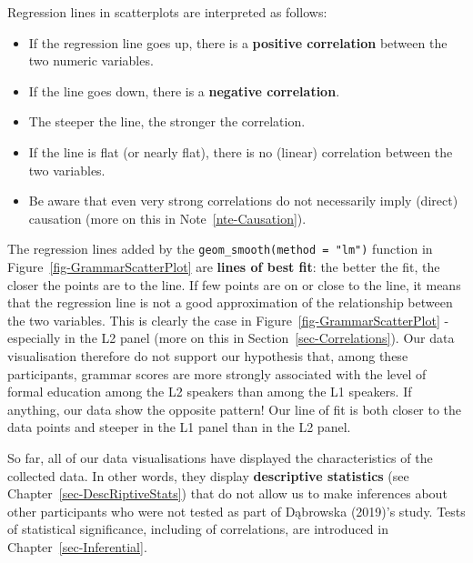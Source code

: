\documentclass[
  letterpaper,
  DIV=11,
  numbers=noendperiod]{scrreprt}
\providecommand{\tightlist}{%
  \setlength{\itemsep}{0pt}\setlength{\parskip}{0pt}}
\begin{document}
Regression lines in scatterplots are interpreted as follows:

\begin{itemize}
\tightlist
\item
  If the regression line goes up, there is a \textbf{positive
  correlation} between the two numeric variables.~
\item
  If the line goes down, there is a \textbf{negative correlation}.~
\item
  The steeper the line, the stronger the correlation.~
\item
  If the line is flat (or nearly flat), there is no (linear) correlation
  between the two variables.~
\item
  Be aware that even very strong correlations do not necessarily imply
  (direct) causation (more on this in Note~\ref{nte-Causation}).~
\end{itemize}

The regression lines added by the \texttt{geom\_smooth(method\ =\ "lm")}
function in Figure~\ref{fig-GrammarScatterPlot} are \textbf{lines of
best fit}: the better the fit, the closer the points are to the line. If
few points are on or close to the line, it means that the regression
line is not a good approximation of the relationship between the two
variables. This is clearly the case in
Figure~\ref{fig-GrammarScatterPlot} - especially in the L2 panel (more
on this in Section~\ref{sec-Correlations}). Our data visualisation
therefore do not support our hypothesis that, among these participants,
grammar scores are more strongly associated with the level of formal
education among the L2 speakers than among the L1 speakers. If anything,
our data show the opposite pattern! Our line of fit is both closer to
the data points and steeper in the L1 panel than in the L2 panel.

\begin{tcolorbox}[enhanced jigsaw, arc=.35mm, bottomrule=.15mm, bottomtitle=1mm, breakable, colback=white, colbacktitle=quarto-callout-warning-color!10!white, colframe=quarto-callout-warning-color-frame, coltitle=black, left=2mm, leftrule=.75mm, opacityback=0, opacitybacktitle=0.6, rightrule=.15mm, title=\textcolor{quarto-callout-warning-color}{\faExclamationTriangle}\hspace{0.5em}{Warning}, titlerule=0mm, toprule=.15mm, toptitle=1mm]

So far, all of our data visualisations have displayed the
characteristics of the collected data. In other words, they display
\textbf{descriptive statistics} (see Chapter~\ref{sec-DescRiptiveStats})
that do not allow us to make inferences about other participants who
were not tested as part of Dąbrowska (2019)'s study. Tests of
statistical significance, including of correlations, are introduced in
Chapter~\ref{sec-Inferential}.

\end{tcolorbox}
\end{document}
